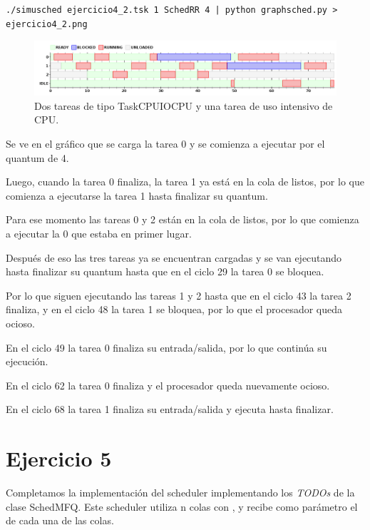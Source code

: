 \begin{framed}
\begin{verbatim}
./simusched ejercicio4_2.tsk 1 SchedRR 4 | python graphsched.py > ejercicio4_2.png
\end{verbatim}
\end{framed}

\begin{figure}[H]
  \centering
    \includegraphics[width=1\textwidth]{img/ejercicio4_2.png}
    \caption{Dos tareas de tipo TaskCPUIOCPU y una tarea de uso intensivo de CPU.}
\end{figure}

Se ve en el gr\'afico que se carga la tarea 0 y se comienza a ejecutar por el quantum de 4.

Luego, cuando la tarea 0 finaliza, la tarea 1 ya est\'a en la cola de listos, por lo que comienza a ejecutarse la tarea 1 hasta finalizar su quantum.

Para ese momento las tareas 0 y 2 est\'an en la cola de listos, por lo que comienza a ejecutar la 0 que estaba en primer lugar.

Despu\'es de eso las tres tareas ya se encuentran cargadas y se van ejecutando hasta finalizar su quantum hasta que en el ciclo 29 la tarea 0 se bloquea.

Por lo que siguen ejecutando las tareas 1 y 2 hasta que en el ciclo 43 la tarea 2 finaliza, y en el ciclo 48 la tarea 1 se bloquea, por lo que el procesador queda ocioso.

En el ciclo 49 la tarea 0 finaliza su entrada/salida, por lo que contin\'ua su ejecuci\'on. 

En el ciclo 62 la tarea 0 finaliza y el procesador queda nuevamente ocioso.

En el ciclo 68 la tarea 1 finaliza su entrada/salida y ejecuta hasta finalizar.


\section{Ejercicio 5}

Completamos la implementaci\'on del scheduler \mfq implementando los \textit{TODOs} de la clase SchedMFQ. Este scheduler utiliza n colas con \rr, y recibe como par\'ametro el \quantum de cada una de las colas.

